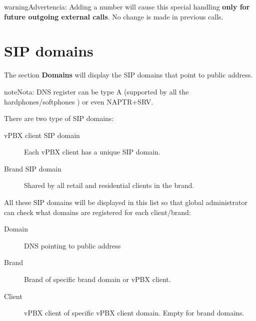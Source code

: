 \documentclass[letterpaper,10pt,spanish]{sphinxmanual}
\begin{document}
\begin{notice}{warning}{Advertencia:}
Adding a number will cause this special handling \textbf{only for future outgoing external calls}.
No change is made in previous calls.
\end{notice}


\section{SIP domains}
\label{administration_portal/platform/sip_domains:sip-domains}\label{administration_portal/platform/sip_domains::doc}\label{administration_portal/platform/sip_domains:god-sipdomains}
The section \textbf{Domains} will display the SIP domains that point to {\hyperref[administration_portal/platform/infrastructure/proxy_users:proxyusers]{}} public address.

\begin{notice}{note}{Nota:}
DNS register can be type A (supported by all the hardphones/softphones
) or even NAPTR+SRV.
\end{notice}

There are two type of SIP domains:
\begin{description}
\item[{vPBX client SIP domain}] \leavevmode{}\label{administration_portal/platform/sip_domains:term-vpbx-client-sip-domain}
Each vPBX client has a unique SIP domain.

\item[{Brand SIP domain}] \leavevmode{}\label{administration_portal/platform/sip_domains:term-brand-sip-domain}
Shared by all retail and residential clients in the brand.

\end{description}

All these SIP domains will be displayed in this list so that global administrator can check
what domains are registered for each client/brand:
\begin{description}
\item[{Domain}] \leavevmode{}\label{administration_portal/platform/sip_domains:term-domain}
DNS pointing to {\hyperref[administration_portal/platform/infrastructure/proxy_users:proxyusers]{}} public address

\item[{Brand}] \leavevmode{}\label{administration_portal/platform/sip_domains:term-brand}
Brand of specific brand domain or vPBX client.

\item[{Client}] \leavevmode{}\label{administration_portal/platform/sip_domains:term-client}
vPBX client of specific vPBX client domain. Empty for brand domains.

\end{description}
\end{document}
